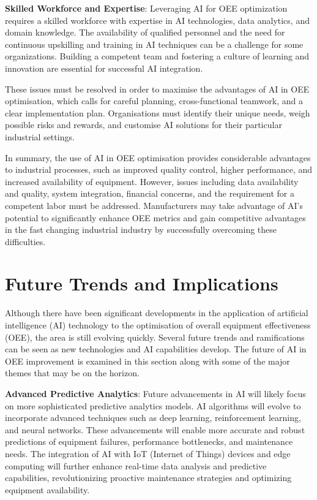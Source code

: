 \documentclass[12pt]{article}
\begin{document}
\textbf{Skilled Workforce and Expertise}: Leveraging AI for OEE optimization requires a skilled workforce with expertise in AI technologies, data analytics, and domain knowledge. The availability of qualified personnel and the need for continuous upskilling and training in AI techniques can be a challenge for some organizations. Building a competent team and fostering a culture of learning and innovation are essential for successful AI integration.

These issues must be resolved in order to maximise the advantages of AI in OEE optimisation, which calls for careful planning, cross-functional teamwork, and a clear implementation plan. Organisations must identify their unique needs, weigh possible risks and rewards, and customise AI solutions for their particular industrial settings.


In summary, the use of AI in OEE optimisation provides considerable advantages to industrial processes, such as improved quality control, higher performance, and increased availability of equipment. However, issues including data availability and quality, system integration, financial concerns, and the requirement for a competent labor must be addressed. Manufacturers may take advantage of AI's potential to significantly enhance OEE metrics and gain competitive advantages in the fast changing industrial industry by successfully overcoming these difficulties.


\section{Future Trends and Implications}
Although there have been significant developments in the application of artificial intelligence (AI) technology to the optimisation of overall equipment effectiveness (OEE), the area is still evolving quickly. Several future trends and ramifications can be seen as new technologies and AI capabilities develop. The future of AI in OEE improvement is examined in this section along with some of the major themes that may be on the horizon.
\vspace{0.3cm}

\textbf{Advanced Predictive Analytics}:
Future advancements in AI will likely focus on more sophisticated predictive analytics models. AI algorithms will evolve to incorporate advanced techniques such as deep learning, reinforcement learning, and neural networks. These advancements will enable more accurate and robust predictions of equipment failures, performance bottlenecks, and maintenance needs. The integration of AI with IoT (Internet of Things) devices and edge computing will further enhance real-time data analysis and predictive capabilities, revolutionizing proactive maintenance strategies and optimizing equipment availability.
\vspace{0.3cm}
\end{document}
